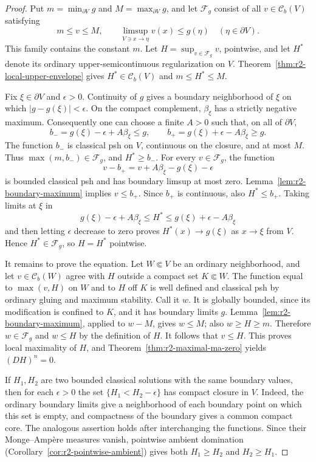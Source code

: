 \documentclass[11pt,a4paper]{article}
\numberwithin{equation}{section}
\theoremstyle{definition}
\theoremstyle{remark}
\newcommand{\Cb}{\mathcal C_b}
\begin{document}
\begin{proof}
Put $m=\min_{\partial V}g$ and $M=\max_{\partial V}g$, and let
$\mathcal F_g$ consist of all $v\in\Cb(V)$ satisfying
\[
 m\leq v\leq M,\qquad
 \limsup_{V\ni x\to\eta}v(x)\leq g(\eta)
       \quad(\eta\in\partial V).
\]
This family contains the constant $m$. Let
$H=\sup_{v\in\mathcal F_g}v$, pointwise, and let $H^*$ denote
its ordinary upper-semicontinuous regularization on $V$.
Theorem~\ref{thm:r2-local-upper-envelope} gives
$H^*\in\Cb(V)$ and $m\leq H^*\leq M$.

Fix $\xi\in\partial V$ and $\epsilon>0$. Continuity of $g$
gives a boundary neighborhood of $\xi$ on which
$|g-g(\xi)|<\epsilon$. On the compact complement,
$\beta_\xi$ has a strictly negative maximum. Consequently
one can choose a finite $A>0$ such that, on all of $\partial V$,
\[
 b_-=g(\xi)-\epsilon+A\beta_\xi\leq g,\qquad
 b_+=g(\xi)+\epsilon-A\beta_\xi\geq g .
\]
The function $b_-$ is classical psh on $V$, continuous on the
closure, and at most $M$. Thus $\max(m,b_-)\in\mathcal F_g$,
and $H^*\geq b_-$. For every $v\in\mathcal F_g$, the function
\[
 v-b_+=v+A\beta_\xi-g(\xi)-\epsilon
\]
is bounded classical psh and has boundary limsup at most zero.
Lemma~\ref{lem:r2-boundary-maximum} implies $v\leq b_+$.
Since $b_+$ is continuous, also $H^*\leq b_+$. Taking limits
at $\xi$ in
\[
 g(\xi)-\epsilon+A\beta_\xi
       \leq H^*
       \leq g(\xi)+\epsilon-A\beta_\xi
\]
and then letting $\epsilon$ decrease to zero proves
$H^*(x)\to g(\xi)$ as $x\to\xi$ from $V$. Hence
$H^*\in\mathcal F_g$, so $H=H^*$ pointwise.

It remains to prove the equation. Let $W\Subset V$ be an
ordinary neighborhood, and let $v\in\Cb(W)$ agree with $H$
outside a compact set $K\Subset W$. The function equal to
$\max(v,H)$ on $W$ and to $H$ off $K$ is well defined and
classical psh by ordinary gluing and maximum stability.
Call it $w$. It is globally bounded, since its modification
is confined to $K$, and it has boundary limits $g$.
Lemma~\ref{lem:r2-boundary-maximum}, applied to $w-M$,
gives $w\leq M$; also $w\geq H\geq m$. Therefore
$w\in\mathcal F_g$ and $w\leq H$ by the definition of $H$.
It follows that $v\leq H$. This proves local maximality
of $H$, and Theorem~\ref{thm:r2-maximal-ma-zero} yields
$(DH)^n=0$.

If $H_1,H_2$ are two bounded classical solutions with the
same boundary values, then for each $\epsilon>0$ the set
$\{H_1<H_2-\epsilon\}$ has compact closure in $V$.
Indeed, the ordinary boundary limits give a neighborhood
of each boundary point on which this set is empty, and
compactness of the boundary gives a common compact core.
The analogous assertion holds after interchanging the
functions. Since their Monge--Amp\`ere measures vanish,
pointwise ambient domination
(Corollary~\ref{cor:r2-pointwise-ambient}) gives both
$H_1\geq H_2$ and $H_2\geq H_1$.


\end{proof}
\end{document}
